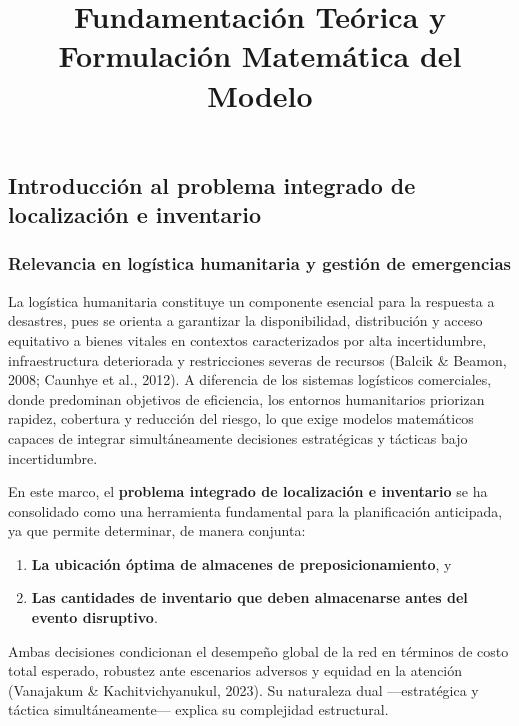 \documentclass[
  spanish,
  letterpaper,
  DIV=11,
  numbers=noendperiod]{scrartcl}
\title{Fundamentación Teórica y Formulación Matemática del Modelo}
\author{}
\date{}
\providecommand{\tightlist}{%
  \setlength{\itemsep}{0pt}\setlength{\parskip}{0pt}}
\begin{document}
\maketitle


\subsection{Introducción al problema integrado de localización e
inventario}\label{introducciuxf3n-al-problema-integrado-de-localizaciuxf3n-e-inventario}

\subsubsection{Relevancia en logística humanitaria y gestión de
emergencias}\label{relevancia-en-loguxedstica-humanitaria-y-gestiuxf3n-de-emergencias}

La logística humanitaria constituye un componente esencial para la
respuesta a desastres, pues se orienta a garantizar la disponibilidad,
distribución y acceso equitativo a bienes vitales en contextos
caracterizados por alta incertidumbre, infraestructura deteriorada y
restricciones severas de recursos (Balcik \& Beamon, 2008; Caunhye et
al., 2012). A diferencia de los sistemas logísticos comerciales, donde
predominan objetivos de eficiencia, los entornos humanitarios priorizan
rapidez, cobertura y reducción del riesgo, lo que exige modelos
matemáticos capaces de integrar simultáneamente decisiones estratégicas
y tácticas bajo incertidumbre.

En este marco, el \textbf{problema integrado de localización e
inventario} se ha consolidado como una herramienta fundamental para la
planificación anticipada, ya que permite determinar, de manera conjunta:

\begin{enumerate}
\def\labelenumi{\arabic{enumi}.}
\tightlist
\item
  \textbf{La ubicación óptima de almacenes de preposicionamiento}, y\\
\item
  \textbf{Las cantidades de inventario que deben almacenarse antes del
  evento disruptivo}.
\end{enumerate}

Ambas decisiones condicionan el desempeño global de la red en términos
de costo total esperado, robustez ante escenarios adversos y equidad en
la atención (Vanajakum \& Kachitvichyanukul, 2023). Su naturaleza dual
---estratégica y táctica simultáneamente--- explica su complejidad
estructural.
\end{document}
